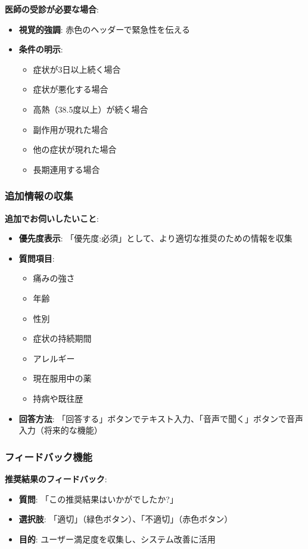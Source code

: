 \documentclass[a4paper,11pt,ja=standard,xelatex]{bxjsarticle}
\theoremstyle{definition}
\begin{document}
\textbf{医師の受診が必要な場合}:
\begin{itemize}
\item \textbf{視覚的強調}: 赤色のヘッダーで緊急性を伝える
\item \textbf{条件の明示}: 
  \begin{itemize}
  \item 症状が3日以上続く場合
  \item 症状が悪化する場合
  \item 高熱（38.5度以上）が続く場合
  \item 副作用が現れた場合
  \item 他の症状が現れた場合
  \item 長期連用する場合
  \end{itemize}
\end{itemize}

\subsubsection{追加情報の収集}

\textbf{追加でお伺いしたいこと}:
\begin{itemize}
\item \textbf{優先度表示}: 「優先度:必須」として、より適切な推奨のための情報を収集
\item \textbf{質問項目}: 
  \begin{itemize}
  \item 痛みの強さ
  \item 年齢
  \item 性別
  \item 症状の持続期間
  \item アレルギー
  \item 現在服用中の薬
  \item 持病や既往歴
  \end{itemize}
\item \textbf{回答方法}: 「回答する」ボタンでテキスト入力、「音声で聞く」ボタンで音声入力（将来的な機能）
\end{itemize}

\subsubsection{フィードバック機能}

\textbf{推奨結果のフィードバック}:
\begin{itemize}
\item \textbf{質問}: 「この推奨結果はいかがでしたか?」
\item \textbf{選択肢}: 「適切」（緑色ボタン）、「不適切」（赤色ボタン）
\item \textbf{目的}: ユーザー満足度を収集し、システム改善に活用
\end{itemize}
\end{document}

